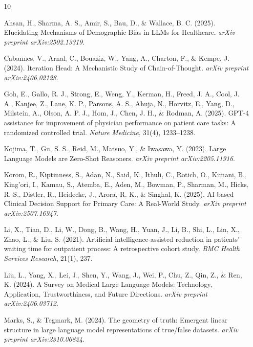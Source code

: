 \documentclass{article}
\begin{document}
\clearpage
\begin{thebibliography}{10}

Ahsan, H., Sharma, A. S., Amir, S., Bau, D., \& Wallace, B. C. (2025).
Elucidating Mechanisms of Demographic Bias in LLMs for Healthcare.
\textit{arXiv preprint arXiv:2502.13319}.

Cabannes, V., Arnal, C., Bouaziz, W., Yang, A., Charton, F., \& Kempe, J. (2024).
Iteration Head: A Mechanistic Study of Chain-of-Thought.
\textit{arXiv preprint arXiv:2406.02128}.

Goh, E., Gallo, R. J., Strong, E., Weng, Y., Kerman, H., Freed, J. A., Cool, J. A., Kanjee, Z., Lane, K. P., Parsons, A. S., Ahuja, N., Horvitz, E., Yang, D., Milstein, A., Olson, A. P. J., Hom, J., Chen, J. H., \& Rodman, A. (2025).
GPT-4 assistance for improvement of physician performance on patient care tasks: A randomized controlled trial.
\textit{Nature Medicine}, 31(4), 1233--1238.

Kojima, T., Gu, S. S., Reid, M., Matsuo, Y., \& Iwasawa, Y. (2023).
Large Language Models are Zero-Shot Reasoners.
\textit{arXiv preprint arXiv:2205.11916}.

Korom, R., Kiptinness, S., Adan, N., Said, K., Ithuli, C., Rotich, O., Kimani, B., King'ori, I., Kamau, S., Atemba, E., Aden, M., Bowman, P., Sharman, M., Hicks, R. S., Distler, R., Heidecke, J., Arora, R. K., \& Singhal, K. (2025).
AI-based Clinical Decision Support for Primary Care: A Real-World Study.
\textit{arXiv preprint arXiv:2507.16947}.

Li, X., Tian, D., Li, W., Dong, B., Wang, H., Yuan, J., Li, B., Shi, L., Lin, X., Zhao, L., \& Liu, S. (2021).
Artificial intelligence-assisted reduction in patients' waiting time for outpatient process: A retrospective cohort study.
\textit{BMC Health Services Research}, 21(1), 237.

Liu, L., Yang, X., Lei, J., Shen, Y., Wang, J., Wei, P., Chu, Z., Qin, Z., \& Ren, K. (2024).
A Survey on Medical Large Language Models: Technology, Application, Trustworthiness, and Future Directions.
\textit{arXiv preprint arXiv:2406.03712}.

Marks, S., \& Tegmark, M. (2024).
The geometry of truth: Emergent linear structure in large language model representations of true/false datasets.
\textit{arXiv preprint arXiv:2310.06824}.


\end{thebibliography}
\end{document}
